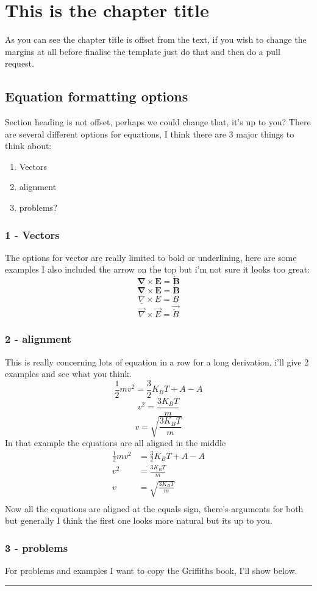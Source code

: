 \documentclass[11pt]{memoir}
\begin{document}
\chapter{This is the chapter title}
As you can see the chapter title is offset from the text, if you wish to change the margins at all before finalise the template just do that and then do a pull request.
%
\section{Equation formatting options}
Section heading is not offset, perhaps we could change that, it's up to you?
 There are several different options for equations, I think there are 3 major things to think about:
%
\begin{enumerate}
	\item Vectors
	\item alignment
	\item problems?
\end{enumerate}
%
\subsection{1 - Vectors}
The options for vector are really limited to bold or underlining, here are some examples I also included the arrow on the top but i'm not sure it looks too great:
%
$$\mathbf{\nabla}\times\mathbf{E} = \mathbf{\dot{B}}$$
%
$$\pmb{\nabla}\times\pmb{E} = \pmb{\dot{B}}$$
%
$$\underline{\nabla}\times\underline{E} = \underline{\dot{B}}$$
%
$$\vec{\nabla}\times\vec{E} = \vec{\dot{B}}$$
%
\subsection{2 - alignment}
This is really concerning lots of equation in a row for a long derivation, i'll give 2 examples and see what you think.
%
$$\frac{1}{2}mv^2=\frac{3}{2}K_BT + A - A$$
%
$$v^2=\frac{3K_BT}{m}$$
%
$$v=\sqrt{\frac{3K_BT}{m}}$$
%
In that example the equations are all aligned in the middle
%
\begin{align*}	
	\frac{1}{2}mv^2&=\frac{3}{2}K_BT + A - A\\
	v^2&=\frac{3K_BT}{m}\\
	v&=\sqrt{\frac{3K_BT}{m}}\\
\end{align*}
%
Now all the equations are aligned at the equals sign, there's arguments for both but generally I think the first one looks more natural but its up to you.
%
\subsection{3 - problems}
For problems and examples I want to copy the Griffiths book, I'll show below.\\
%
\noindent\rule[0.2ex]{\linewidth}{0.1cm}
\end{document}
